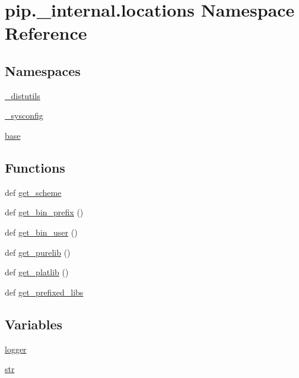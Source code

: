 \hypertarget{namespacepip_1_1__internal_1_1locations}{}\section{pip.\+\_\+internal.\+locations Namespace Reference}
\label{namespacepip_1_1__internal_1_1locations}
\subsection*{Namespaces}
\begin{DoxyCompactItemize}
\item 
 \hyperlink{namespacepip_1_1__internal_1_1locations_1_1__distutils}{\+\_\+distutils}
\item 
 \hyperlink{namespacepip_1_1__internal_1_1locations_1_1__sysconfig}{\+\_\+sysconfig}
\item 
 \hyperlink{namespacepip_1_1__internal_1_1locations_1_1base}{base}
\end{DoxyCompactItemize}
\subsection*{Functions}
\begin{DoxyCompactItemize}
\item 
def \hyperlink{namespacepip_1_1__internal_1_1locations_ab4dfbceafc4eee95b0b921654574da53}{get\+\_\+scheme}
\item 
def \hyperlink{namespacepip_1_1__internal_1_1locations_a92ffd6d78b56bff8d5c053858f849ac9}{get\+\_\+bin\+\_\+prefix} ()
\item 
def \hyperlink{namespacepip_1_1__internal_1_1locations_a676a00881609d30628476f97b671d31d}{get\+\_\+bin\+\_\+user} ()
\item 
def \hyperlink{namespacepip_1_1__internal_1_1locations_a02178a88bffc5811ebb85155ef65fffd}{get\+\_\+purelib} ()
\item 
def \hyperlink{namespacepip_1_1__internal_1_1locations_a7fb6fe730b484324e8c68c1beb8fa735}{get\+\_\+platlib} ()
\item 
def \hyperlink{namespacepip_1_1__internal_1_1locations_aa6b1a7d0519b9412304cb1f00722aa14}{get\+\_\+prefixed\+\_\+libs}
\end{DoxyCompactItemize}
\subsection*{Variables}
\begin{DoxyCompactItemize}
\item 
\hyperlink{namespacepip_1_1__internal_1_1locations_a4eaf836f2839a717fc720247323b1251}{logger}
\item 
\hyperlink{namespacepip_1_1__internal_1_1locations_aeb081a5421d9074db2a25fa0debe62fc}{str}
\end{DoxyCompactItemize}


